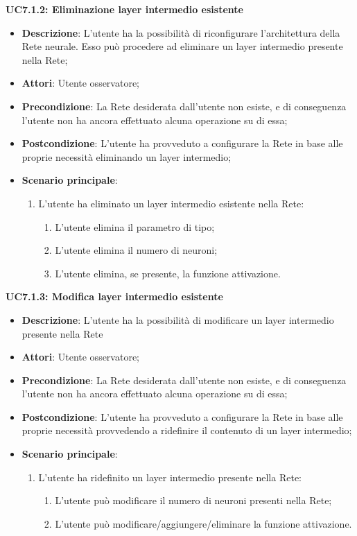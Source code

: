 \textbf{UC7.1.2: Eliminazione layer intermedio esistente}
\label{UC7.1.2: Eliminazione layer intermedio esistente}
\noindent
\begin{itemize}
\item \textbf{Descrizione}: L'utente ha la possibilit\`a di riconfigurare l'architettura della Rete neurale. Esso pu\`o procedere ad eliminare un layer intermedio presente nella Rete;
\item \textbf{Attori}: Utente osservatore;
\item \textbf{Precondizione}: La Rete desiderata dall'utente non esiste, e di conseguenza l'utente non ha ancora effettuato alcuna operazione su di essa;
\item \textbf{Postcondizione}: L'utente ha provveduto a configurare la Rete in base alle proprie necessit\`a eliminando un layer intermedio;
\item \textbf{Scenario principale}:
\begin{enumerate}
\item L'utente ha eliminato un layer intermedio esistente nella Rete:
\begin{enumerate}
\item L'utente elimina il parametro di tipo;
\item L'utente elimina il numero di neuroni;
\item L'utente elimina, se presente, la funzione attivazione.
\end{enumerate}
\end{enumerate}
\end{itemize}

\textbf{UC7.1.3: Modifica layer intermedio esistente}
\label{UC7.1.3: Modifica layer intermedio esistente}
\noindent
\begin{itemize}
\item \textbf{Descrizione}: L'utente ha la possibilit\`a di modificare un layer intermedio presente nella Rete
\item \textbf{Attori}: Utente osservatore;
\item \textbf{Precondizione}: La Rete desiderata dall'utente non esiste, e di conseguenza l'utente non ha ancora effettuato alcuna operazione su di essa;
\item \textbf{Postcondizione}: L'utente ha provveduto a configurare la Rete in base alle proprie necessit\`a 
provvedendo a ridefinire il contenuto di un layer intermedio;
\item \textbf{Scenario principale}:
\begin{enumerate}
\item L'utente ha ridefinito un layer intermedio presente nella Rete:
\begin{enumerate}
\item L'utente pu\`o modificare il numero di neuroni presenti nella Rete;
\item L'utente pu\`o modificare/aggiungere/eliminare la funzione attivazione.
\end{enumerate}
\end{enumerate}
\end{itemize}



